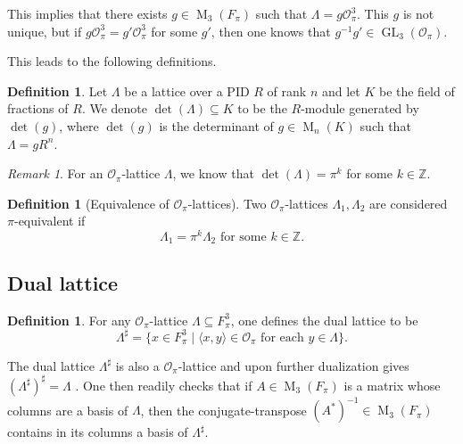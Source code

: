 \documentclass{eptcs}
\theoremstyle{remark}
\newtheorem{remark}[theorem]{Remark}
\theoremstyle{definition}
\newtheorem{definition}[theorem]{Definition}
\DeclareMathOperator{\GL}{GL}
\DeclareMathOperator{\M}{M}
\newcommand{\dual}[1]{{#1}^{\sharp}}
\begin{document}
This implies that there exists $g \in \M_{3}(F_{\pi})$ such that $\Lambda = g \mathcal{O}_{\pi}^{3}$. This $g$ is not unique, but if  $g \mathcal{O}_{\pi}^{3} = g' \mathcal{O}_{\pi}^{3}$ for some $g'$, then one knows that $g^{-1} g' \in \GL_3(\mathcal{O}_{\pi})$. 

This leads to the following definitions.


\begin{definition}
  Let $\Lambda$ be a lattice over a PID $R$ of rank $n$ and let $K$ be the field of fractions of $R$. We denote $\det(\Lambda) \subseteq K$ to be the $R$-module generated by $\det(g)$, where $\det(g)$ 
  is the determinant of $g \in \M_{n}(K)$ such that $\Lambda = g R^{n}$.
\end{definition}
\begin{remark}
  For an $\mathcal{O}_{\pi}$-lattice $\Lambda$, we know that $ \det(\Lambda) = \pi^{k}$ for some $k \in \mathbb{Z}$.
\end{remark} 
\begin{definition}[Equivalence of $\mathcal{O}_{\pi}$-lattices]
    Two $\mathcal{O}_{\pi}$-lattices $\Lambda_{1},\Lambda_{2}$ are considered $\pi$-equivalent if 
    \begin{equation}
        \Lambda_{1} = \pi^{k}\Lambda_{2} \text{ for some } k \in \mathbb{Z}.
    \end{equation}
\end{definition}

\subsection{Dual lattice}
  \label{se:dual_lattice}

\begin{definition}
	For any $\mathcal{O}_{\pi}$-lattice $\Lambda \subseteq F_{\pi}^{3}$, one defines the dual lattice to be 
	\begin{equation}
		\dual{ \Lambda } = \{x \in F_{\pi}^{3} \mid \langle x,y \rangle \in \mathcal{O}_{\pi} \text{ for each }y \in \Lambda \}.
	\end{equation}
\end{definition}
The dual lattice $\dual{\Lambda}$ is also a $\mathcal{O}_{\pi}$-lattice and upon further dualization gives $\dual{(\dual{\Lambda})}= \Lambda$ .
One then readily checks that if $A \in \M_{3}(F_{\pi})$ is a matrix whose columns are a basis of $\Lambda$, then the conjugate-transpose $( A^{*} )^{-1} \in \M_{3}(F_{\pi})$ contains in its columns a basis of $\dual{\Lambda}$. 
\end{document}
